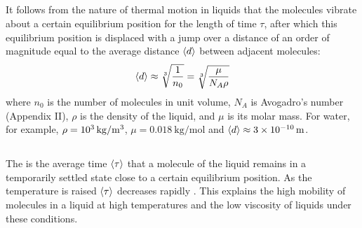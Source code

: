 \subsection{}\label{13.2.3} It follows from the nature of thermal motion in liquids  that the molecules vibrate about a certain equilibrium position for the length of time $\tau$, after which this equilibrium position is displaced with a jump over a distance of an order of magnitude equal to the average distance $\expval{d}$ between adjacent molecules:
\begin{equation*}%
\expval{d} \approx \sqrt[3]{\frac{1}{n_{0}}} = \sqrt[3]{\frac{\mu}{N_{A} \rho}}
\end{equation*}
where $n_{0}$ is the number of molecules in unit volume, $N_{A}$ is Avogadro's number (Appendix II), $\rho$ is the density of the liquid, and $\mu$ is its molar mass. For water, for example, $\rho = \SI{d3}{\kilo\gram\per\meter\cubed}$, $\mu = \SI{0.018}{\kilo\gram\per\mole}$ and $\expval{d} \approx \SI{3d-10}{\meter}$.

\subsection{}\label{13.2.4} The  is the average time $\expval{\tau}$ that a molecule of the liquid remains in a temporarily settled state close to a certain equilibrium position. As the temperature is raised $\expval{\tau}$ decreases rapidly . This explains the high mobility of molecules in a liquid at high temperatures and the low viscosity of liquids under these conditions.

